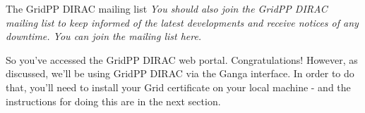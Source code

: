 \begin{infobox}{The GridPP DIRAC mailing list}
\emph{You should also join the GridPP DIRAC mailing list to keep informed of
the latest developments and receive notices of any downtime. You can
join the mailing list here.}
\end{infobox}

So you've accessed the GridPP DIRAC web portal. Congratulations!
However, as discussed, we'll be using GridPP DIRAC via the Ganga
interface. In order to do that, you'll need to install your Grid
certificate on your local machine - and the instructions for
doing this are in the next section.
